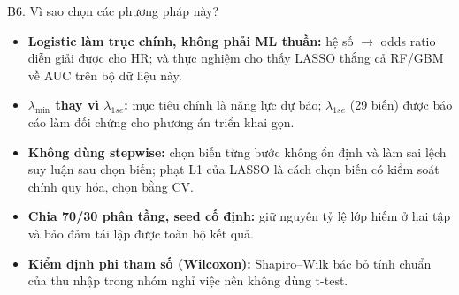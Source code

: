 \documentclass[10pt,aspectratio=169]{beamer}
\begin{document}
\begin{frame}{B6. Vì sao chọn các phương pháp này?}
  \small
  \begin{itemize}
    \item \textbf{Logistic làm trục chính, không phải ML thuần:}
          hệ số $\to$ odds ratio diễn giải được cho HR; và thực nghiệm
          cho thấy LASSO thắng cả RF/GBM về AUC trên bộ dữ liệu này.
    \vspace{0.12cm}
    \item \textbf{$\lambda_{\min}$ thay vì $\lambda_{1se}$:}
          mục tiêu chính là năng lực dự báo; $\lambda_{1se}$ (29 biến)
          được báo cáo làm đối chứng cho phương án triển khai gọn.
    \vspace{0.12cm}
    \item \textbf{Không dùng stepwise:} chọn biến từng bước không ổn định
          và làm sai lệch suy luận sau chọn biến; phạt L1 của LASSO là
          cách chọn biến có kiểm soát chính quy hóa, chọn bằng CV.
    \vspace{0.12cm}
    \item \textbf{Chia 70/30 phân tầng, seed cố định:} giữ nguyên tỷ lệ
          lớp hiếm ở hai tập và bảo đảm tái lập được toàn bộ kết quả.
    \vspace{0.12cm}
    \item \textbf{Kiểm định phi tham số (Wilcoxon):} Shapiro--Wilk bác bỏ
          tính chuẩn của thu nhập trong nhóm nghỉ việc nên không dùng t-test.
  \end{itemize}
\end{frame}
\end{document}
